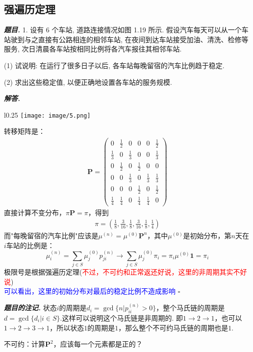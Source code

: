 \documentclass[10pt, a4paper, oneside]{ctexart}
\newenvironment{problem}{\begin{framed}\par\noindent\textbf{\textit{题目. }}}{\end{framed}\par}
\newenvironment{solution}{%
  \par\noindent\textbf{\textit{解答. }}\ignorespaces
}{%
  \hfill\ensuremath{\square}\par %
}
\newenvironment{note}{\par\noindent\textbf{\textit{题目的注记. }}\ignorespaces}{\par}
\begin{document}
\subsection{强遍历定理}
\begin{problem}
    1. 设有 6 个车站, 道路连接情况如图 1.19 所示. 假设汽车每天可以从一个车站驶到与之直接有公路相连的相邻车站, 在夜间到达车站接受加油、清洗、检修等服务, 次日清晨各车站按相同比例将各汽车报往其相邻车站.

(1) 试说明: 在运行了很多日子以后, 各车站每晚留宿的汽车比例趋于稳定.

(2) 求出这些稳定值, 以便正确地设置各车站的服务规模.
\end{problem}
\begin{solution}\\
    \begin{wrapfigure}{l}{0.25\textwidth} %
        \centering
        \texttt{[image: image/5.png]} %
    \end{wrapfigure}
    转移矩阵是：
    \begin{align*}
        \mathbf{P}=\begin{pmatrix}
            0&\frac{1}{2}&0&0&0&\frac{1}{2}\\
            \frac{1}{3}&0&\frac{1}{3}&0&0&\frac{1}{3}\\
            0&\frac{1}{2}&0&\frac{1}{2}&0&0\\
            0&0&\frac{1}{3}&0&\frac{1}{3}&\frac{1}{3}\\
            0&0&0&\frac{1}{2}&0&\frac{1}{2}\\
            \frac{1}{4}&\frac{1}{4}&0&\frac{1}{4}&\frac{1}{4}&0
        \end{pmatrix}
    \end{align*}
    直接计算不变分布，$\pi\mathbf{P}=\pi$，得到
    \begin{align*}
        \pi=(\frac{1}{8},\frac{3}{16},\frac{1}{8},\frac{3}{16},\frac{1}{8},\frac{1}{4})
    \end{align*}
    而"每晚留宿的汽车比例"应该是$\mu^{(n)}=\mu^{(0)}\mathbf{P}^n$，其中$\mu^{(0)}$是初始分布，第$n$天在$i$车站的比例是：
    $$\mu_i^{(n)}=\sum_{j\in S}\mu_j^{(0)}p_{ji}^{(n)}\to \sum_{j\in S}\mu_j^{(0)}\pi_i=\pi_i \mu^{(0)}\mathbf{1}=\pi_i$$
    极限号是根据强遍历定理(\textcolor{red}{不过，不可约和正常返还好说，这里的非周期其实不好说})\\
    \textcolor{blue}{可以看出，这里的初始分布对最后的稳定比例不造成影响}
\end{solution}
\begin{note}
    状态$i$的周期是$d_i=\gcd \{n| p_{ii}^{(n)}>0\}$，整个马氏链的周期是$d=\gcd\{d_i|i\in S\}$.这样可以说明这个马氏链是非周期的. 即$1\to 2\to 1$，也可以$1\to 2\to 3\to 1$，所以状态$1$的周期是$1$，那么整个不可约马氏链的周期也是$1$.

    不可约：计算$\mathbf{P}^2$，应该每一个元素都是正的？
\end{note}
\end{document}
